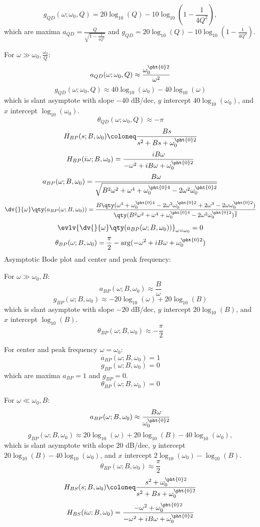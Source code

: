 \documentclass[a4paper,12pt]{report}
\begin{document}
\[g_{QD}(\omega;\omega_0,Q)=20\log_{10}(Q)-10\log_{10}(1-\frac{1}{4Q^2}),\]
which are maxima $a_{QD}=\frac{Q}{\sqrt{1-\frac{1}{4Q^2}}}$ and $g_{QD}=20\log_{10}(Q)-10\log_{10}(1-\frac{1}{4Q^2})$.
\item For $\omega\gg\omega_0,\frac{\omega_0}{Q}$:
\[a_{QD}(\omega;\omega_0,Q)\approx\frac{\omega_0^{\pht{0}2}}{\omega^2}\]
\[g_{QD}(\omega;\omega_0,Q)\approx 40\log_{10}(\omega_0)-40\log_{10}(\omega)\]
which is slant asymptote with slope $-40$ dB/dec, $y$ intercept $40\log_{10}(\omega_0)$, and $x$ intercept $\log_{10}(\omega_0)$.
\[\theta_{QD}(\omega;\omega_0,Q)\approx-\pi\]
\eit
{}
\[H_{BP}(s;B,\omega_0)\coloneq\frac{Bs}{s^2+Bs+\omega_0^{\pht{0}2}}\]
\[H_{BP}(i\omega;B,\omega_0)=\frac{iB\omega}{-\omega^2+iB\omega+\omega_0^{\pht{0}2}}\]
\[a_{BP}(\omega;B,\omega_0)=\frac{B\omega}{\sqrt{B^2\omega^2+\omega^4+\omega_0^{\pht{0}4}-2\omega^2\omega_0^{\pht{0}2}}}\]
\[\dv{}{\omega}\qty(a_{BP}(\omega;B,\omega_0))=\frac{B\qty(\omega^4+\omega_0^{\pht{0}4}-2\omega^2\omega_0^{\pht{0}2}+2\omega^3-2\omega\omega_0^{\pht{0}2})}{\qty(B^2\omega^2+\omega^4+\omega_0^{\pht{0}4}-2\omega^2\omega_0^{\pht{0}2})^{\frac{3}{2}}}\]
\[\evlv{\dv{}{\omega}\qty(a_{BP}(\omega;B,\omega_0))}_{\omega=\omega_0}=0\]
\[\theta_{BP}(\omega;B,\omega_0)=\frac{\pi}{2}-\arg(-\omega^2+iB\omega+\omega_0^{\pht{0}2})\]
Asymptotic Bode plot and center and peak frequency:
\bit
\item For $\omega\gg\omega_0,B$:
\[a_{BP}(\omega;B,\omega_0)\approx\frac{B}{\omega}\]
\[g_{BP}(\omega;B,\omega_0)\approx-20\log_{10}(\omega)+20\log_{10}(B)\]
which is slant asymptote with slope $-20$ dB/dec, $y$ intercept $20\log_{10}(B)$, and $x$ intercept $\log_{10}(B)$.
\[\theta_{BP}(\omega;B,\omega_0)\approx-\frac{\pi}{2}\]
\item For center and peak frequency $\omega=\omega_0$:
\[a_{BP}(\omega;B,\omega_0)=1\]
\[g_{BP}(\omega;B,\omega_0)=0\]
which are maxima $a_{BP}=1$ and $g_{BP}=0$.
\[\theta_{BP}(\omega;B,\omega_0)=0\]
\item For $\omega\ll\omega_0,B$:
\[a_{BP}(\omega;B,\omega_0)\approx\frac{B\omega}{\omega_0^{\pht{0}2}}\]
\[g_{BP}(\omega;B,\omega_0)\approx 20\log_{10}(\omega)+20\log_{10}(B)-40\log_{10}(\omega_0),\]
which is slant asymptote with slope $20$ dB/dec, $y$ intercept $20\log_{10}(B)-40\log_{10}(\omega_0)$, and $x$ intercept $2\log_{10}(\omega_0)-\log_{10}(B)$.
\[\theta_{BP}(\omega;B,\omega_0)\approx\frac{\pi}{2}\]
\eit
{}
\[H_{BS}(s;B,\omega_0)\coloneq\frac{s^2+\omega_0^{\pht{0}2}}{s^2+Bs+\omega_0^{\pht{0}2}}\]
\[H_{BS}(i\omega;B,\omega_0)=\frac{-\omega^2+\omega_0^{\pht{0}2}}{-\omega^2+iB\omega+\omega_0^{\pht{0}2}}\]
\end{document}
